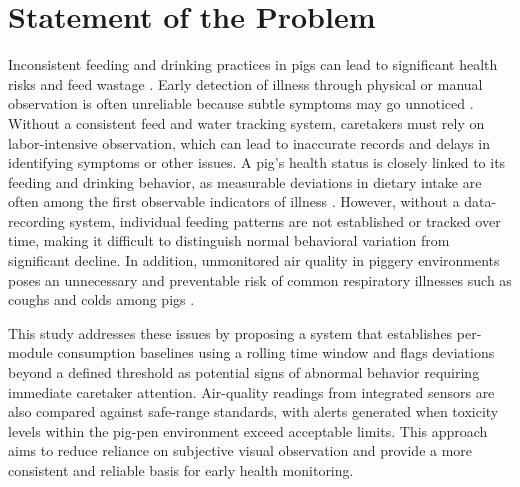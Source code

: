 \section{Statement of the Problem}

Inconsistent feeding and drinking practices in pigs can lead to significant health risks and feed wastage \cite{oecdfao2025outlook}. Early detection of illness through physical or manual observation is often unreliable because subtle symptoms may go unnoticed \cite{usda2026pork}. Without a consistent feed and water tracking system, caretakers must rely on labor-intensive observation, which can lead to inaccurate records and delays in identifying symptoms or other issues. A pig's health status is closely linked to its feeding and drinking behavior, as measurable deviations in dietary intake are often among the first observable indicators of illness \cite{dingcong2017monitoring}. However, without a data-recording system, individual feeding patterns are not established or tracked over time, making it difficult to distinguish normal behavioral variation from significant decline. In addition, unmonitored air quality in piggery environments poses an unnecessary and preventable risk of common respiratory illnesses such as coughs and colds among pigs \cite{livestockproduction2026}.

This study addresses these issues by proposing a system that establishes per-module consumption baselines using a rolling time window and flags deviations beyond a defined threshold as potential signs of abnormal behavior requiring immediate caretaker attention. Air-quality readings from integrated sensors are also compared against safe-range standards, with alerts generated when toxicity levels within the pig-pen environment exceed acceptable limits. This approach aims to reduce reliance on subjective visual observation and provide a more consistent and reliable basis for early health monitoring.
